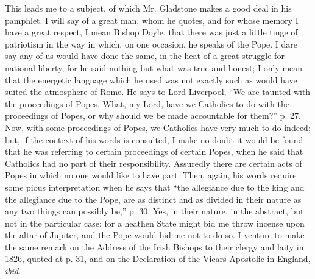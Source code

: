 This leads me to a subject, of which Mr. Gladstone makes a good deal
in his pamphlet. I will say of a great man, whom he quotes, and
for whose memory I have a great respect, I mean Bishop Doyle, that there
was just a little tinge of patriotism in the way in which, on one
occasion, he speaks of the Pope. I dare say any of us would have done
the same, in the heat of a great struggle for national liberty, for he
said nothing but what was true and honest; I only mean that the
energetic language which he used was not exactly such as would have
suited the atmosphere of Rome. He says to Lord Liverpool, ``We are
taunted with the proceedings of Popes. What, my Lord, have we Catholics
to do with the proceedings of Popes, or why should we be made
accountable for them?'' p. 27. Now, with some proceedings of Popes,
we Catholics have very much to do indeed; but, if the context of his
words is consulted, I make no doubt it would be found that he was
referring to certain proceedings of certain Popes, when he said that
Catholics had no part of their responsibility. Assuredly there are
certain acts of Popes in which no one would like to have part. Then,
again, his words require some pious interpretation when he says that
``the allegiance due to the king and the allegiance due to the Pope,
are as distinct and as divided in their nature as any two things can
possibly be,'' p. 30. Yes, in their nature, in the abstract, but not
in the particular case; for a heathen State might bid me throw incense
upon the altar of Jupiter, and the Pope would bid me not to do so. I
venture to make the same remark on the Address of the Irish Bishops to
their clergy and laity in 1826, quoted at p. 31, and on the Declaration
of the Vicars Apostolic in England, \emph{ibid}.

